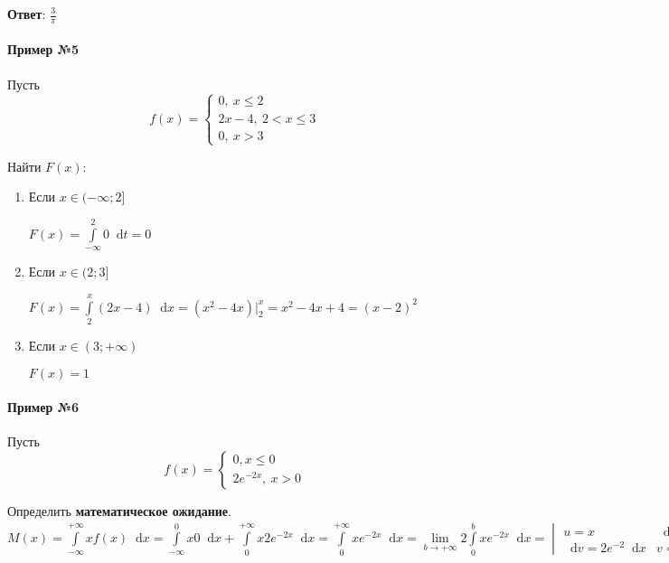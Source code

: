 \documentclass{article}
\newcommand*\diff{\mathop{}\!\mathrm{d}}
\begin{document}
\textbf{Ответ}: $\frac{3}{\pi}$

\paragraph{Пример №5}

Пусть $$f(x) = \begin{cases}
    0, \ x \le 2 \\
    2x - 4, \ 2 < x \le 3 \\
    0, \ x > 3
\end{cases}$$

Найти $F(x)$:

\begin{enumerate}
    \item Если $x \in (-\infty; 2]$
    
    $F(x) = \int\limits_{-\infty}^{2} 0 \diff t = 0$
    \item Если $x \in (2; 3]$
    
    $F(x) = \int\limits_{2}^{x} (2x - 4) \diff x = (x^2 - 4x) \bigg|_{2}^{x} = x^2 - 4x + 4 = (x-2)^2$
    \item Если $x \in (3; +\infty)$
    
    $F(x) = 1$
\end{enumerate}

\paragraph{Пример №6}

Пусть $$f(x) = \begin{cases}
    0, x \le 0 \\
    2e^{-2x}, \ x > 0 
\end{cases}$$

Определить \textbf{математическое ожидание}. $M(x) = \int\limits_{-\infty}^{+\infty} x f(x) \diff x = \int\limits_{-\infty}^{0} x 0 \diff x + \int\limits_{0}^{+\infty} x 2 e^{-2x} \diff x = \int\limits_{0}^{+\infty} x e^{-2x} \diff x = \lim\limits_{b \to +\infty} 2 \int\limits_{0}^{b} x e^{-2x} \diff x = \begin{vmatrix}
    u = x & \diff u = \diff x \\
    \diff v = 2 e^{-2} \diff x & v = -e^{-2x}
\end{vmatrix} = \lim\limits_{b \to +\infty} (-x e^{- 2x} \bigg|_0^b + \int\limits_{0}^{b} e^{-2x} \diff x) = \lim\limits_{b \to +\infty} (-b e^{- 2 b} - \frac{1}{2} e^{-2x} \bigg|_{0}^{b}) = \lim\limits_{b \to +\infty} (-b e^{-2 b} - \frac{1}{2} e^{-2b} + \frac{1}{2}) = 0.5$
\end{document}
